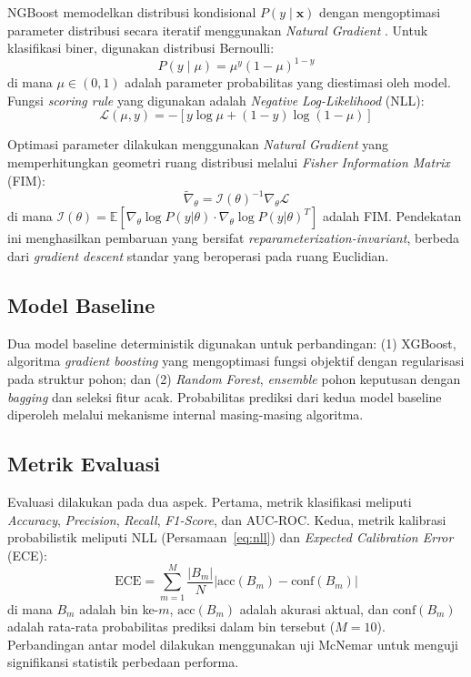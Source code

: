 \documentclass[metlit,article,accept,pdftex,moreauthors]{Definitions/mdpi}
\begin{document}
NGBoost memodelkan distribusi kondisional $P(y \mid \mathbf{x})$ dengan mengoptimasi parameter distribusi secara iteratif menggunakan \textit{Natural Gradient} \cite{duan2020ngboost}. Untuk klasifikasi biner, digunakan distribusi Bernoulli:
\begin{equation}
P(y \mid \mu) = \mu^{y}(1-\mu)^{1-y}
\label{eq:bernoulli}
\end{equation}
di mana $\mu \in (0,1)$ adalah parameter probabilitas yang diestimasi oleh model. Fungsi \textit{scoring rule} yang digunakan adalah \textit{Negative Log-Likelihood} (NLL):
\begin{equation}
\mathcal{L}(\mu, y) = -[y \log \mu + (1-y) \log(1-\mu)]
\label{eq:nll}
\end{equation}

Optimasi parameter dilakukan menggunakan \textit{Natural Gradient} yang memperhitungkan geometri ruang distribusi melalui \textit{Fisher Information Matrix} (FIM):
\begin{equation}
\tilde{\nabla}_\theta = \mathcal{I}(\theta)^{-1} \nabla_\theta \mathcal{L}
\label{eq:natural_gradient}
\end{equation}
di mana $\mathcal{I}(\theta) = \mathbb{E}\left[\nabla_\theta \log P(y|\theta) \cdot \nabla_\theta \log P(y|\theta)^T\right]$ adalah FIM. Pendekatan ini menghasilkan pembaruan yang bersifat \textit{reparameterization-invariant}, berbeda dari \textit{gradient descent} standar yang beroperasi pada ruang Euclidian.

\subsection{Model Baseline}

Dua model baseline deterministik digunakan untuk perbandingan: (1) XGBoost, algoritma \textit{gradient boosting} yang mengoptimasi fungsi objektif dengan regularisasi pada struktur pohon; dan (2) \textit{Random Forest}, \textit{ensemble} pohon keputusan dengan \textit{bagging} dan seleksi fitur acak. Probabilitas prediksi dari kedua model baseline diperoleh melalui mekanisme internal masing-masing algoritma.

\subsection{Metrik Evaluasi}

Evaluasi dilakukan pada dua aspek. Pertama, metrik klasifikasi meliputi \textit{Accuracy}, \textit{Precision}, \textit{Recall}, \textit{F1-Score}, dan AUC-ROC. Kedua, metrik kalibrasi probabilistik meliputi NLL (Persamaan~\ref{eq:nll}) dan \textit{Expected Calibration Error} (ECE):
\begin{equation}
\text{ECE} = \sum_{m=1}^{M} \frac{|B_m|}{N} \left| \text{acc}(B_m) - \text{conf}(B_m) \right|
\label{eq:ece}
\end{equation}
di mana $B_m$ adalah bin ke-$m$, $\text{acc}(B_m)$ adalah akurasi aktual, dan $\text{conf}(B_m)$ adalah rata-rata probabilitas prediksi dalam bin tersebut ($M=10$). Perbandingan antar model dilakukan menggunakan uji McNemar untuk menguji signifikansi statistik perbedaan performa.
\end{document}
